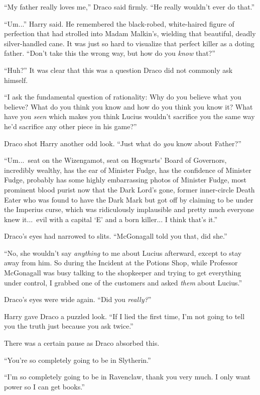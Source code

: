 “My father really loves me,” Draco said firmly. “He really wouldn’t ever do that.”

“Um...” Harry said. He remembered the black-robed, white-haired figure of perfection that had strolled into Madam Malkin’s, wielding that beautiful, deadly silver-handled cane. It was just so hard to visualize that perfect killer as a doting father. “Don’t take this the wrong way, but how do you \emph{know} that?”

“Huh?” It was clear that this was a question Draco did not commonly ask himself.

“I ask the fundamental question of rationality: Why do you believe what you believe? What do you think you know and how do you think you know it? What have you \emph{seen} which makes you think Lucius wouldn’t sacrifice you the same way he’d sacrifice any other piece in his game?”

Draco shot Harry another odd look. “Just what do \emph{you} know about Father?”

“Um...\ seat on the Wizengamot, seat on Hogwarts’ Board of Governors, incredibly wealthy, has the ear of Minister Fudge, has the confidence of Minister Fudge, probably has some highly embarrassing photos of Minister Fudge, most prominent blood purist now that the Dark Lord’s gone, former inner-circle Death Eater who was found to have the Dark Mark but got off by claiming to be under the Imperius curse, which was ridiculously implausible and pretty much everyone knew it...\ evil with a capital ‘E’ and a born killer... I think that’s it.”

Draco’s eyes had narrowed to slits. “McGonagall told you that, did she.”

“No, she wouldn’t say \emph{anything} to me about Lucius afterward, except to stay away from him. So during the Incident at the Potions Shop, while Professor McGonagall was busy talking to the shopkeeper and trying to get everything under control, I grabbed one of the customers and asked \emph{them} about Lucius.”

Draco’s eyes were wide again. “Did you \emph{really?}”

Harry gave Draco a puzzled look. “If I lied the first time, I’m not going to tell you the truth just because you ask twice.”

There was a certain pause as Draco absorbed this.

“You’re so completely going to be in Slytherin.”

“I’m so completely going to be in Ravenclaw, thank you very much. I only want power so I can get books.”

